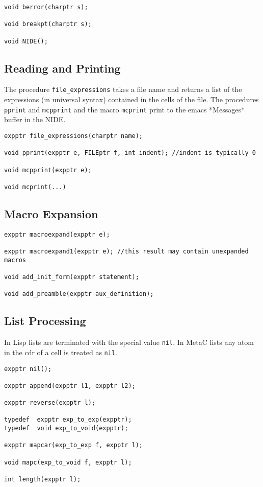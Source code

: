 \documentclass{article}
\begin{document}
\begin{verbatim}
void berror(charptr s);

void breakpt(charptr s);

void NIDE();
\end{verbatim}

\subsection{Reading and Printing}
The procedure {\tt file\_expressions} takes a file name and returns a
list of the expressions (in universal syntax) contained in the cells
of the file.  The procedures {\tt pprint} and {\tt mcpprint} and the macro {\tt mcprint} print to the emacs *Messages* buffer in
the NIDE.

\begin{verbatim}
expptr file_expressions(charptr name);

void pprint(expptr e, FILEptr f, int indent); //indent is typically 0

void mcpprint(expptr e);

void mcprint(...)
\end{verbatim}

\subsection{Macro Expansion}

\begin{verbatim}
expptr macroexpand(expptr e);

expptr macroexpand1(expptr e); //this result may contain unexpanded macros

void add_init_form(expptr statement);

void add_preamble(expptr aux_definition);
\end{verbatim}

\subsection{List Processing}

In Lisp lists are terminated with the special value {\tt nil}.  In MetaC lists any atom in the
cdr of a cell is treated as {\tt nil}.

\begin{verbatim}
expptr nil();

expptr append(expptr l1, expptr l2);

expptr reverse(expptr l);

typedef  expptr exp_to_exp(expptr);
typedef  void exp_to_void(expptr);

expptr mapcar(exp_to_exp f, expptr l);

void mapc(exp_to_void f, expptr l);

int length(expptr l);
\end{verbatim}
\end{document}

